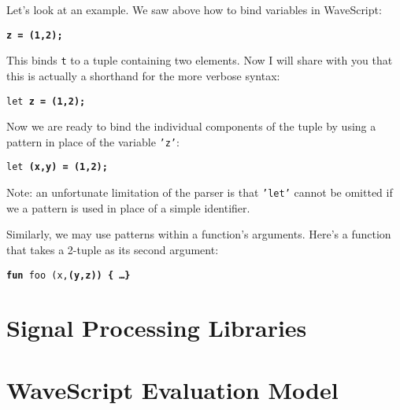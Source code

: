 Let's look at an example.
We saw above how to bind variables in WaveScript:
\begin{center}
{\tt \bf{z} = (1,2);}
\end{center}
This binds {\tt t} to a tuple containing two elements.  
Now I will share with you that this is actually a shorthand for the
more verbose syntax:
\begin{center}
{\tt let \bf{z} = (1,2);}
\end{center}
Now we are ready to bind the individual components of the tuple by using
a pattern in place of the variable {\tt 'z'}:
\begin{center}
{\tt let \bf{(x,y)} = (1,2);}
\end{center}
Note: an unfortunate limitation of the parser is that {\tt 'let'} cannot be
omitted if we a pattern is used in place of a simple identifier.

Similarly, we may use patterns within a function's arguments.  Here's
a function that takes a 2-tuple as its second argument:

\begin{center}
{\tt {\bf fun} foo (x,\bf{(y,z)}) \{ \dots \}}
\end{center}


\chapter{Signal Processing Libraries}



\chapter{WaveScript Evaluation Model}





